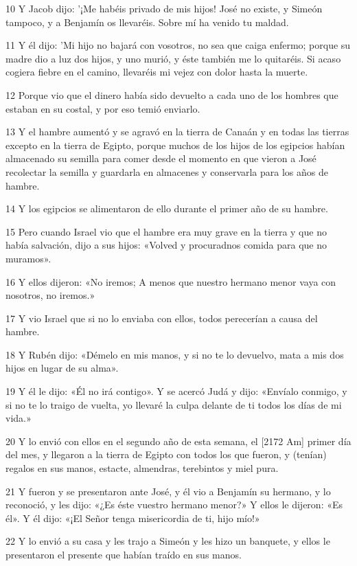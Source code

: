 \par 10 Y Jacob dijo: '¡Me habéis privado de mis hijos! José no existe, y Simeón tampoco, y a Benjamín os llevaréis. Sobre mí ha venido tu maldad.
\par 11 Y él dijo: 'Mi hijo no bajará con vosotros, no sea que caiga enfermo; porque su madre dio a luz dos hijos, y uno murió, y éste también me lo quitaréis. Si acaso cogiera fiebre en el camino, llevaréis mi vejez con dolor hasta la muerte.
\par 12 Porque vio que el dinero había sido devuelto a cada uno de los hombres que estaban en su costal, y por eso temió enviarlo.
\par 13 Y el hambre aumentó y se agravó en la tierra de Canaán y en todas las tierras excepto en la tierra de Egipto, porque muchos de los hijos de los egipcios habían almacenado su semilla para comer desde el momento en que vieron a José recolectar la semilla y guardarla en almacenes y conservarla para los años de hambre.
\par 14 Y los egipcios se alimentaron de ello durante el primer año de su hambre.
\par 15 Pero cuando Israel vio que el hambre era muy grave en la tierra y que no había salvación, dijo a sus hijos: «Volved y procuradnos comida para que no muramos».
\par 16 Y ellos dijeron: «No iremos; A menos que nuestro hermano menor vaya con nosotros, no iremos.»
\par 17 Y vio Israel que si no lo enviaba con ellos, todos perecerían a causa del hambre.
\par 18 Y Rubén dijo: «Démelo en mis manos, y si no te lo devuelvo, mata a mis dos hijos en lugar de su alma».
\par 19 Y él le dijo: «Él no irá contigo». Y se acercó Judá y dijo: «Envíalo conmigo, y si no te lo traigo de vuelta, yo llevaré la culpa delante de ti todos los días de mi vida.»
\par 20 Y lo envió con ellos en el segundo año de esta semana, el [2172 Am] primer día del mes, y llegaron a la tierra de Egipto con todos los que fueron, y (tenían) regalos en sus manos, estacte, almendras, terebintos y miel pura.
\par 21 Y fueron y se presentaron ante José, y él vio a Benjamín su hermano, y lo reconoció, y les dijo: «¿Es éste vuestro hermano menor?» Y ellos le dijeron: «Es él». Y él dijo: «¡El Señor tenga misericordia de ti, hijo mío!»
\par 22 Y lo envió a su casa y les trajo a Simeón y les hizo un banquete, y ellos le presentaron el presente que habían traído en sus manos.
